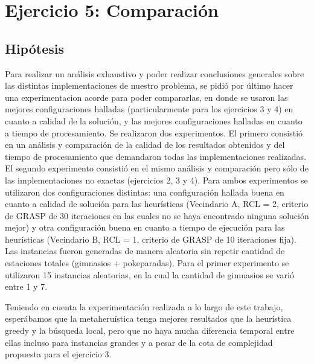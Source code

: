 \section{Ejercicio 5: Comparación}


    \subsection{Hipótesis}
        Para realizar un análisis exhaustivo y poder realizar conclusiones generales sobre las distintas implementaciones de nuestro problema, se pidió por último hacer una experimentacion acorde para poder compararlas, en donde se usaron las mejores configuraciones halladas (particularmente para los ejercicios 3 y 4) en cuanto a calidad de la solución, y las mejores configuraciones halladas en cuanto a tiempo de procesamiento. 
        Se realizaron dos experimentos. El primero consistió en un análisis y comparación de la calidad de los resultados obtenidos y del tiempo de procesamiento que demandaron todas las implementaciones realizadas. El segundo experimento consistió en el mismo análisis y comparación pero sólo de las implementaciones no exactas (ejercicios 2, 3 y 4). Para ambos experimentos se utilizaron dos configuraciones distintas: una configuración hallada buena en cuanto a calidad de solución para las heurísticas (Vecindario A, RCL = 2, criterio de GRASP de 30 iteraciones en las cuales no se haya encontrado ninguna solución mejor) y otra configuración buena en cuanto a tiempo de ejecución para las heurísticas (Vecindario B, RCL = 1, criterio de GRASP de 10 iteraciones fija).
        Las instancias fueron generadas de manera aleatoria sin repetir cantidad de estaciones totales (gimnasios + pokeparadas). Para el primer experimento se utilizaron 15 instancias aleatorias, en la cual la cantidad de gimnasios se varió entre 1 y 7. 

        Teniendo en cuenta la experimentación realizada a lo largo de este trabajo, esperábamos que la metaheruística tenga mejores resultados que la heurística greedy y la búsqueda local, pero que no haya mucha diferencia temporal entre ellas incluso para instancias grandes y a pesar de la cota de complejidad propuesta para el ejercicio 3.

